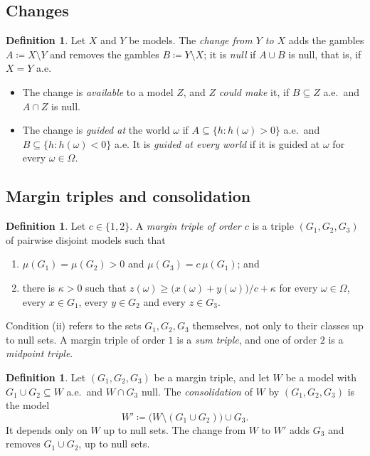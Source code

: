 \documentclass[11pt]{article}
\theoremstyle{plain}
\theoremstyle{definition}
\newtheorem{definition}[theorem]{Definition}
\theoremstyle{remark}
\begin{document}
\subsection{Changes}

\begin{definition}\label{def:change}
Let $X$ and $Y$ be models. The \emph{change from $Y$ to $X$} adds the gambles
$A\coloneqq X\setminus Y$ and removes the gambles $B\coloneqq Y\setminus X$; it is \emph{null}
if $A\cup B$ is null, that is, if $X=Y$ a.e.
\begin{itemize}
  \item The change is \emph{available} to a model $Z$, and $Z$ \emph{could make} it, if
  $B\subseteq Z$ a.e.\ and $A\cap Z$ is null.
  \item The change is \emph{guided at} the world $\omega$ if $A\subseteq\{h:h(\omega)>0\}$
  a.e.\ and $B\subseteq\{h:h(\omega)<0\}$ a.e. It is \emph{guided at every world} if it is
  guided at $\omega$ for every $\omega\in\Omega$.
\end{itemize}
\end{definition}

\subsection{Margin triples and consolidation}

\begin{definition}\label{def:triple}
Let $c\in\{1,2\}$. A \emph{margin triple of order $c$} is a triple $(G_1,G_2,G_3)$ of pairwise
disjoint models such that
\begin{enumerate}[label=(\roman*)]
  \item $\mu(G_1)=\mu(G_2)>0$ and $\mu(G_3)=c\,\mu(G_1)$; and
  \item there is $\kappa>0$ such that $z(\omega)\ge\bigl(x(\omega)+y(\omega)\bigr)/c+\kappa$ for
  every $\omega\in\Omega$, every $x\in G_1$, every $y\in G_2$ and every $z\in G_3$.
\end{enumerate}
Condition (ii) refers to the sets $G_1,G_2,G_3$ themselves, not only to their classes up to
null sets. A margin triple of order $1$ is a \emph{sum triple}, and one of order $2$ is a
\emph{midpoint triple}.
\end{definition}

\begin{definition}\label{def:consolidation}
Let $(G_1,G_2,G_3)$ be a margin triple, and let $W$ be a model with $G_1\cup G_2\subseteq W$
a.e.\ and $W\cap G_3$ null. The \emph{consolidation} of $W$ by $(G_1,G_2,G_3)$ is the model
\[
  W'\coloneqq\bigl(W\setminus(G_1\cup G_2)\bigr)\cup G_3 .
\]
It depends only on $W$ up to null sets. The change from $W$ to $W'$ adds $G_3$ and removes
$G_1\cup G_2$, up to null sets.
\end{definition}
\end{document}
